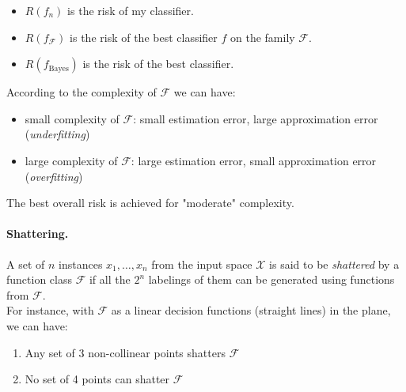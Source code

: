 \begin{itemize}
	\item $R(f_n)$ is the risk of my classifier.
	\item $R(f_\mathcal{ F })$ is the risk of the best classifier $f$ on the family $\mathcal{ F }$.
	\item $R \left( f _ { \text {Bayes} } \right)$ is the risk of the best classifier.
\end{itemize}
According to the complexity of $\mathcal{ F }$ we can have:
\begin{itemize}
	\item small complexity of $\mathcal{ F }$: small estimation error, large approximation error (\textit{underfitting})
	\item large complexity of $\mathcal{ F }$: large estimation error, small approximation error (\textit{overfitting})
\end{itemize}
The best overall risk is achieved for "moderate" complexity.

\paragraph*{Shattering.} A set of $n$ instances $x_1, \dots, x_n$ from the input space $\mathcal{X}$ is said to be \textit{shattered} by a function class $\mathcal{ F }$ if all the $2^n$ labelings of them can be generated using functions from $\mathcal{ F }$.\\ 
For instance, with $\mathcal{ F }$ as a linear decision functions (straight lines) in the plane, we can have:
\begin{enumerate}[label=(\alph*)]
	\item Any set of 3 non-collinear points shatters $\mathcal{ F }$
	\item No set of 4 points can shatter $\mathcal{ F }$
\end{enumerate}

